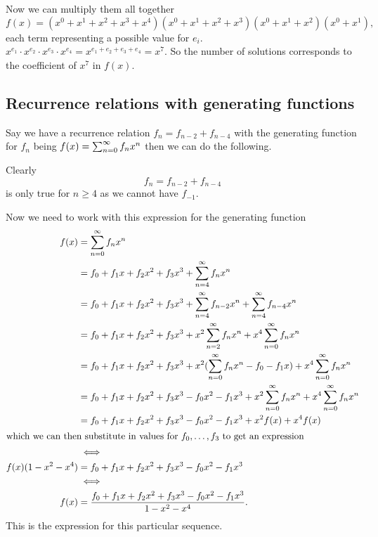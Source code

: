 \documentclass[10pt, a4paper]{article}
\begin{document}
Now we can multiply them all together
\[
f(x) = (x ^ 0 + x ^ 1 + x ^ 2 + x ^ 3 + x ^ 4)(x ^ 0 + x ^ 1 + x ^ 2 + x ^ 3)(x ^ 0 + x ^ 1 + x ^ 2)(x ^ 0 + x ^ 1),
\]
each term representing a possible value for $e_i$.
$x ^ {e_1}\cdot x ^ {e_2}\cdot x ^ {e_3}\cdot x ^ {e_4} = x ^ {e_1 + e_2 + e_3 + e_4} = x ^ 7$.
So the number of solutions corresponds to the coefficient of $x ^ 7$ in $f(x)$.

\subsection{Recurrence relations with generating functions}
Say we have a recurrence relation $f_n = f_{n - 2} + f_{n - 4}$ with the generating function for $f_n$ being $f(x) = \infsum[n = 0]f_nx ^ n$ then we can do the following.

Clearly
\[
f_n = f_{n - 2} + f_{n - 4}
\]
is only true for $n \geq 4$ as we cannot have $f_{-1}$.

Now we need to work with this expression for the generating function
\begin{align*}
    f(x) &= \infsum[n = 0]f_nx ^ n \\
    &= f_0 + f_1x + f_2x ^ 2 + f_3x ^ 3 + \infsum[n = 4]f_nx ^ n \\
    &= f_0 + f_1x + f_2x ^ 2 + f_3x ^ 3 + \infsum[n = 4]f_{n - 2}x ^ n + \infsum[n = 4]f_{n - 4}x ^ n \\
    &= f_0 + f_1x + f_2x ^ 2 + f_3x ^ 3 + x ^ 2\infsum[n = 2]f_nx ^ n + x ^ 4\infsum[n = 0]f_nx ^ n \\
    &= f_0 + f_1x + f_2x ^ 2 + f_3x ^ 3 + x ^ 2(\infsum[n = 0]f_nx ^ n - f_0 - f_1x) + x ^ 4\infsum[n = 0]f_nx ^ n \\
    &= f_0 + f_1x + f_2x ^ 2 + f_3x ^ 3 - f_0x ^ 2 - f_1x ^ 3 + x ^ 2\infsum[n = 0]f_nx ^ n + x ^ 4\infsum[n = 0]f_nx ^ n \\
    &= f_0 + f_1x + f_2x ^ 2 + f_3x ^ 3 - f_0x ^ 2 - f_1x ^ 3 + x ^ 2f(x) + x ^ 4f(x) \\
    \intertext{which we can then substitute in values for $f_0, \dotsc, f_3$ to get an expression}
    &\iff \\
    f(x)(1 - x ^ 2 - x ^ 4) &= f_0 + f_1x + f_2x ^ 2 + f_3x ^ 3 - f_0x ^ 2 - f_1x ^ 3 \\
    &\iff \\
    f(x) &= \frac{f_0 + f_1x + f_2x ^ 2 + f_3x ^ 3 - f_0x ^ 2 - f_1x ^ 3}{1 - x ^ 2 - x ^ 4}.
\end{align*}
This is the expression for this particular sequence.
\end{document}

